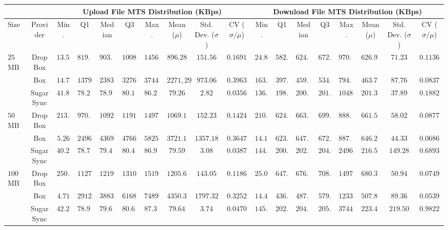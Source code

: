 \begin{table}
\renewcommand{\arraystretch}{1}\addtolength{\tabcolsep}{-3pt}
\tiny
\centering
\begin{tabular}{|p{0.55cm}|c|c|c|c|c|c|c|c|c|c|c|c|c|c|c|c|c|}
\hline

& & \multicolumn{8}{|c|}{Upload File MTS Distribution (KBps)} & \multicolumn{8}{|c|}{Download File MTS Distribution (KBps)} \\

\hline
Size 		& Provider & Min. & Q1 & Median & Q3 & Max. & Mean ($\mu$) & Std. Dev. ($\sigma$) & CV ($\sigma/\mu$) &
										Min. & Q1 & Median & Q3 & Max. & Mean ($\mu$) & Std. Dev. ($\sigma$) & CV ($\sigma/\mu$) \\ \hline
\multirow{3}{*}{$25$MB} 
 & DropBox & $13.54$ & $819.20$ & $903.94$ & $1008.24$ & $1456.36$ & $896.28$ & $151.56$ & $0.1691$ &
 							$24.89$ & $582.54$ & $624.152$ & $672.16$ & $970.90$ & $626.94$ & $71.23$ & $0.1136$  \\
 & Box & $14.70$ & $1379.71$ & $2383.13$ & $3276.80$ & $3744.91$ & $2271,29$ & $973.06$ & $0.3963$ &
 					$163.84$ & $397.19$ & $459.90$ & $534.99$ & $794.38$ & $463.72$ & $87.76$ & $0.0837$  \\
 & SugarSync & $41.87$ & $78.25$ & $78.96$ & $80.17$ & $86.23$ & $79.26$ & $2.82$ & $0.0356$  &
 								$136.53$ & $198.59$ & $200.11$ & $201.65$ & $1048.57$ & $201.35$ & $37.89$ & $0.1882$  \\ \hline
 								
\multirow{3}{*}{$50$MB} 
 & DropBox & $213.99$ & $970.90$ & $1092.27$ & $1191.56$ & $1497.97$ & $1069.12$ & $152.23$ & $0.1424$ & 
 							$210.56$ & $624.15$ & $663.66$ & $699.05$ & $888.62$ & $661.55$ & $58.02$ & $0.0877$   \\
 & Box & $5.26$ & $2496.61$ & $4369.07$ & $4766.25$ & $5825.42$ & $3721.12$ & $1357.18$ & $0.3647$  &
 					$14.15$ & $623.16$ & $647.26$ & $672.16$ & $887.42$ & $646.22$ & $44.33$ & $0.0686$  \\
 & SugarSync & $40.27$ & $78.72$ & $79.44$ & $80.41$ & $86.95$ & $79.59$ & $3.08$ & $0.0387$ &
 								$144.43$ & $200.88$ & $202.43$ & $204.00$ & $2496.61$ & $216.57$ & $149.28$ & $0.6893$  \\ \hline
 								
\multirow{3}{*}{$100$MB} 
 & DropBox & $250.26$ & $1127.50$ & $1219.27$ & $1310.72$ & $1519.66$ & $1205.69$ & $143.05$ & $0.1186$ &  
 							$25.09$ & $647.27$ & $676.50$ & $708.49$ & $1497.97$ & $680.32$ & $50.94$ & $0.0749$  \\
 & Box & $4.71$ & $2912.71$ & $3883.61$ & $6168.09$ & $7489.83$ & $4350.37$ & $1797.32$ & $0.3252$ &
 					$14.43$ & $436.91$ & $487.71$ & $579.32$ & $1233.62$ & $507.82$ & $89.36$ & $0.0539$  \\ 
 & SugarSync & $42.23$ & $78.96$ & $79.62$ & $80.66$ & $87.31$ & $79.64$ & $3.74$ & $0.0470$  &
 							$145.64$ & $202.03$ & $204.00$ & $205.20$ & $3744.91$ & $223.49$ & $219.50$ & $0.9822$  \\ \hline
 

\end{tabular}
\end{table}
